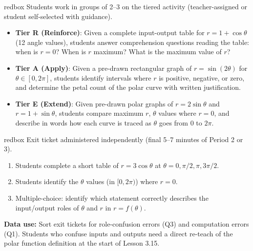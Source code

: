 \documentclass[10pt]{article}
\begin{document}
\begin{skillbox}{redbox}
Students work in groups of 2--3 on the tiered activity (teacher-assigned
or student self-selected with guidance).

\begin{itemize}[leftmargin=1.4em, itemsep=4pt]
  \item \textbf{Tier R (Reinforce)}: Given a complete input-output table for
    $r = 1 + \cos\theta$ (12 angle values), students answer comprehension
    questions reading the table: when is $r = 0$? When is $r$ maximum?
    What is the maximum value of $r$?
  \item \textbf{Tier A (Apply)}: Given a pre-drawn rectangular graph of
    $r = \sin(2\theta)$ for $\theta \in [0, 2\pi]$, students identify
    intervals where $r$ is positive, negative, or zero, and determine the
    petal count of the polar curve with written justification.
  \item \textbf{Tier E (Extend)}: Given pre-drawn polar graphs of
    $r = 2\sin\theta$ and $r = 1 + \sin\theta$, students compare maximum
    $r$, $\theta$ values where $r = 0$, and describe in words how each
    curve is traced as $\theta$ goes from $0$ to $2\pi$.
\end{itemize}
\end{skillbox}

\vspace{0.08in}

\begin{skillbox}{redbox}
Exit ticket administered independently (final 5--7 minutes of Period 2 or 3).

\begin{enumerate}[leftmargin=1.4em, itemsep=4pt]
  \item Students complete a short table of $r = 3\cos\theta$ at
    $\theta = 0, \pi/2, \pi, 3\pi/2$.
  \item Students identify the $\theta$ values (in $[0, 2\pi)$) where $r = 0$.
  \item Multiple-choice: identify which statement correctly describes the
    input/output roles of $\theta$ and $r$ in $r = f(\theta)$.
\end{enumerate}

\textbf{Data use:} Sort exit tickets for role-confusion errors (Q3) and
computation errors (Q1). Students who confuse inputs and outputs need
a direct re-teach of the polar function definition at the start of
Lesson 3.15.
\end{skillbox}
\end{document}
